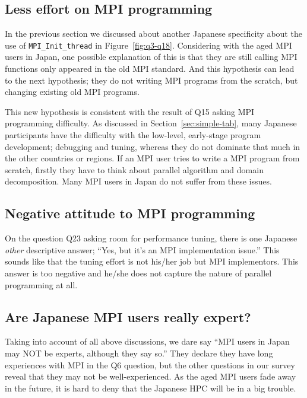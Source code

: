\documentclass[submit,techrep,noauthor,english]{ipsj}
\begin{document}
\subsection{Less effort on MPI programming}

In the previous section we discussed about another Japanese
specificity about the use of {\tt MPI\_Init\_thread} in
Figure~\ref{fig:q3-q18}. Considering with the aged MPI users in Japan,
one possible explanation of this is that they are still calling MPI
functions only appeared in the old MPI standard. And this hypothesis
can lead to the next hypothesis; they do not writing MPI programs from
the scratch, but changing existing old MPI programs.

This new hypothesis is consistent with the result of Q15 asking MPI
programming difficulty. As discussed in Section~\ref{sec:simple-tab},
many Japanese participants have the difficulty with the low-level,
early-stage program development; debugging and tuning, whereas they do
not dominate that much in the other countries or regions. If an MPI user 
tries to write a MPI program from scratch, firstly they have to think about
parallel algorithm and domain decomposition.  Many MPI users in
Japan do not suffer from these issues.

\subsection{Negative attitude to MPI programming}

On the question Q23 asking room for performance tuning, there is one
Japanese {\it other} descriptive answer; ``Yes, but it’s an MPI
implementation issue.'' This sounds like that the tuning effort is not
his/her job but MPI implementors. This answer is too negative and
he/she does not capture the nature of parallel programming at all.

\subsection{Are Japanese MPI users really expert?}

Taking into account of all above discussions, we dare say ``MPI users
in Japan may NOT be experts, although they say so.'' They declare they
have long experiences with MPI in the Q6 question, but the other
questions in our survey reveal that they may not be
well-experienced. As the aged MPI users fade away in the future, it is
hard to deny that the Japanese HPC will be in a big trouble. 
\end{document}
